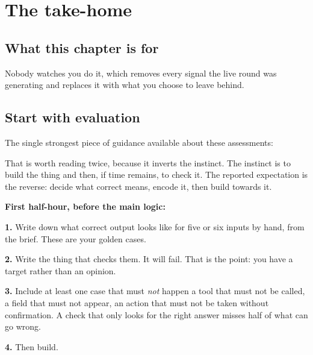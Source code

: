 \chapter{The take-home}
\label{ch:takehome}

\section*{What this chapter is for}

 Nobody watches you do
it, which removes every signal the live round was generating and replaces it
with what you choose to leave behind.

\section{Start with evaluation}

The single strongest piece of guidance available about these assessments:

That is worth reading twice, because it inverts the instinct. The instinct is
to build the thing and then, if time remains, to check it. The reported
expectation is the reverse: decide what correct means, encode it, then build
towards it.

\begin{kitmethod}
\textbf{First half-hour, before the main logic:}

\textbf{1.} Write down what correct output looks like for five or six inputs
\dash{} by hand, from the brief. These are your golden cases.

\textbf{2.} Write the thing that checks them. It will fail. That is the point:
you have a target rather than an opinion.

\textbf{3.} Include at least one case that must \emph{not} happen \dash{} a
tool that must not be called, a field that must not appear, an action that must
not be taken without confirmation. A check that only looks for the right answer
misses half of what can go wrong.

\textbf{4.} Then build.
\end{kitmethod}

